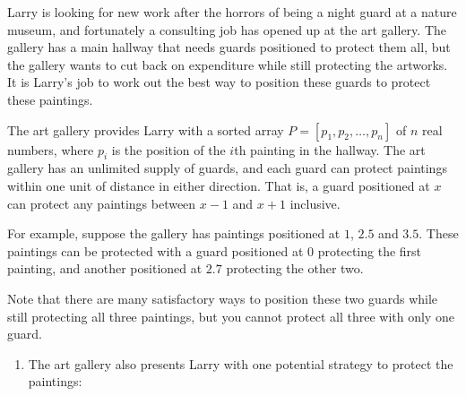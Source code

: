 \documentclass[12pt]{article}
\begin{document}
\begin{question}
Larry is looking for new work after the horrors of being a night guard at a nature museum, and fortunately a consulting job has opened up at the art gallery. The gallery has a main hallway that needs guards positioned to protect them all, but the gallery wants to cut back on expenditure while still protecting the artworks. It is Larry's job to work out the best way to position these guards to protect these paintings.

The art gallery provides Larry with a sorted array $P = [p_1, p_2, \ldots, p_n]$ of $n$ real numbers, where $p_i$ is the position of the $i$th painting in the hallway. The art gallery has an unlimited supply of guards, and each guard can protect paintings within one unit of distance in either direction. That is, a guard positioned at $x$ can protect any paintings between $x - 1$ and $x + 1$ inclusive. 

For example, suppose the gallery has paintings positioned at $1$, $2.5$ and $3.5$. These paintings can be protected with a guard positioned at $0$ protecting the first painting, and another positioned at $2.7$ protecting the other two.

\begin{center}
\end{center}

Note that there are many satisfactory ways to position these two guards while still protecting all three paintings, but you cannot protect all three with only one guard.

\begin{enumerate}
\item The art gallery also presents Larry with one potential strategy to protect the paintings:


\end{enumerate}
\end{question}
\end{document}
